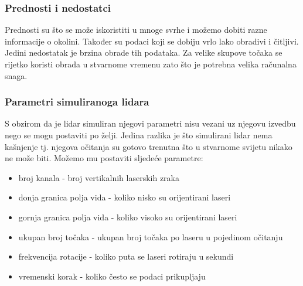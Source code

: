 \subsubsection{Prednosti i nedostatci}

Prednosti su što se može iskoristiti u mnoge svrhe i možemo dobiti razne informacije o okolini. Također su podaci koji se dobiju vrlo lako obradivi i čitljivi. Jedini nedostatak je brzina obrade tih podataka. Za velike skupove točaka se rijetko koristi obrada u stvarnome vremenu zato što je potrebna velika računalna snaga.

\subsubsection{Parametri simuliranoga lidara}

S obzirom da je lidar simuliran njegovi parametri nisu vezani uz njegovu izvedbu nego se mogu postaviti po želji. Jedina razlika je što simulirani lidar nema kašnjenje tj. njegova očitanja su gotovo trenutna što u stvarnome svijetu nikako ne može biti.
Možemo mu postaviti sljedeće parametre:

\begin{itemize}
  \item broj kanala - broj vertikalnih laserskih zraka
  \item donja granica polja vida - koliko nisko su orijentirani laseri
  \item gornja granica polja vida - koliko visoko su orijentirani laseri
  \item ukupan broj točaka - ukupan broj točaka po laseru u pojedinom očitanju
  \item frekvencija rotacije - koliko puta se laseri rotiraju u sekundi
  \item vremenski korak - koliko često se podaci prikupljaju
\end{itemize}